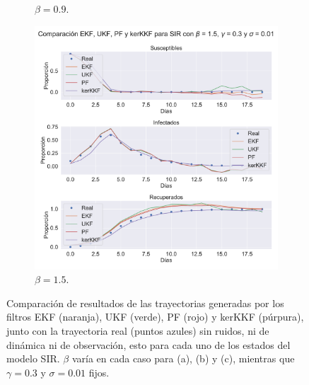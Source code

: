\begin{figure}[h!]
\begin{subfigure}[b]{0.49\textwidth}
    \caption{$\beta = 0.9$.}
    \label{fig:nonlinear_filters_sir_beta_09}
    \end{subfigure}
    \begin{subfigure}[b]{0.49\textwidth}
        \includegraphics[width=\linewidth]{img/content/chapter4/nonlinear_filters_sir_beta_15.pdf}
    \caption{$\beta = 1.5$.}
    \label{fig:nonlinear_filters_sir_beta_15}
    \end{subfigure}
    \caption{Comparación de resultados de las trayectorias generadas por los filtros EKF (naranja), UKF (verde), PF (rojo) y kerKKF (púrpura), junto con la trayectoria real (puntos azules) sin ruidos, ni de dinámica ni de observación, esto para cada uno de los estados del modelo SIR. $\beta$ varía en cada caso para (a), (b) y (c), mientras que $\gamma = 0.3$ y $\sigma = 0.01$ fijos.}
\end{figure}

